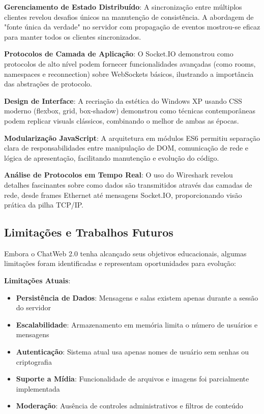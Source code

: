 \documentclass[conference,compsoc]{IEEEtran}
\begin{document}
\begin{otherlanguage}{brazil}
\textbf{Gerenciamento de Estado Distribuído}: A sincronização entre múltiplos clientes revelou desafios únicos na manutenção de consistência. A abordagem de "fonte única da verdade" no servidor com propagação de eventos mostrou-se eficaz para manter todos os clientes sincronizados.

\textbf{Protocolos de Camada de Aplicação}: O Socket.IO demonstrou como protocolos de alto nível podem fornecer funcionalidades avançadas (como rooms, namespaces e reconnection) sobre WebSockets básicos, ilustrando a importância das abstrações de protocolo.

\textbf{Design de Interface}: A recriação da estética do Windows XP usando CSS moderno (flexbox, grid, box-shadow) demonstrou como técnicas contemporâneas podem replicar visuals clássicos, combinando o melhor de ambas as épocas.

\textbf{Modularização JavaScript}: A arquitetura em módulos ES6 permitiu separação clara de responsabilidades entre manipulação de DOM, comunicação de rede e lógica de apresentação, facilitando manutenção e evolução do código.

\textbf{Análise de Protocolos em Tempo Real}: O uso do Wireshark revelou detalhes fascinantes sobre como dados são transmitidos através das camadas de rede, desde frames Ethernet até mensagens Socket.IO, proporcionando visão prática da pilha TCP/IP.

\subsection{Limitações e Trabalhos Futuros}

Embora o ChatWeb 2.0 tenha alcançado seus objetivos educacionais, algumas limitações foram identificadas e representam oportunidades para evolução:

\textbf{Limitações Atuais}:
\begin{itemize}
\item \textbf{Persistência de Dados}: Mensagens e salas existem apenas durante a sessão do servidor
\item \textbf{Escalabilidade}: Armazenamento em memória limita o número de usuários e mensagens
\item \textbf{Autenticação}: Sistema atual usa apenas nomes de usuário sem senhas ou criptografia
\item \textbf{Suporte a Mídia}: Funcionalidade de arquivos e imagens foi parcialmente implementada
\item \textbf{Moderação}: Ausência de controles administrativos e filtros de conteúdo
\end{itemize}


\end{otherlanguage}
\end{document}
